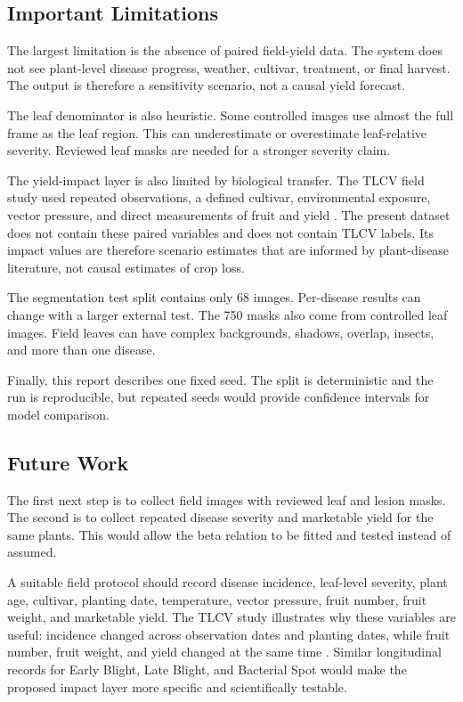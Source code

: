\documentclass[12pt,a4paper]{article}
\begin{document}
\subsection{Important Limitations}
The largest limitation is the absence of paired field-yield data. The system does not see
plant-level disease progress, weather, cultivar, treatment, or final harvest. The output is
therefore a sensitivity scenario, not a causal yield forecast.

The leaf denominator is also heuristic. Some controlled images use almost the full frame
as the leaf region. This can underestimate or overestimate leaf-relative severity. Reviewed
leaf masks are needed for a stronger severity claim.

The yield-impact layer is also limited by biological transfer. The TLCV field study used
repeated observations, a defined cultivar, environmental exposure, vector pressure, and
direct measurements of fruit and yield \cite{iftikhar2021tlcv}. The present dataset does
not contain these paired variables and does not contain TLCV labels. Its impact values are
therefore scenario estimates that are informed by plant-disease literature, not causal
estimates of crop loss.

The segmentation test split contains only 68 images. Per-disease results can change with a
larger external test. The 750 masks also come from controlled leaf images. Field leaves can
have complex backgrounds, shadows, overlap, insects, and more than one disease.

Finally, this report describes one fixed seed. The split is deterministic and the run is
reproducible, but repeated seeds would provide confidence intervals for model comparison.

\subsection{Future Work}
The first next step is to collect field images with reviewed leaf and lesion masks. The
second is to collect repeated disease severity and marketable yield for the same plants.
This would allow the beta relation to be fitted and tested instead of assumed.

A suitable field protocol should record disease incidence, leaf-level severity, plant age,
cultivar, planting date, temperature, vector pressure, fruit number, fruit weight, and
marketable yield. The TLCV study illustrates why these variables are useful: incidence
changed across observation dates and planting dates, while fruit number, fruit weight, and
yield changed at the same time \cite{iftikhar2021tlcv}. Similar longitudinal records for
Early Blight, Late Blight, and Bacterial Spot would make the proposed impact layer more
specific and scientifically testable.
\end{document}
